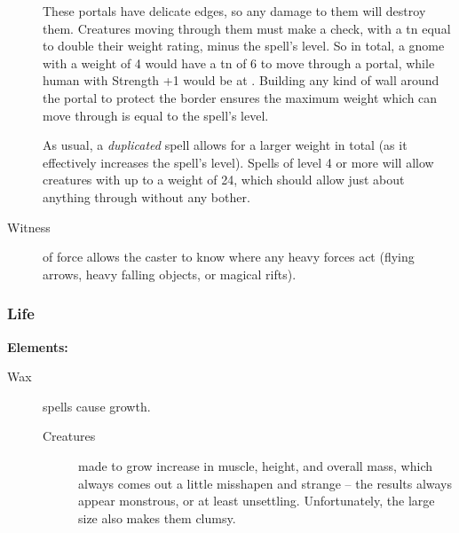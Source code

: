 \begin{multicols}{2}
\begin{description}
  These portals have delicate edges, so any damage to them will destroy them.
  Creatures moving through them must make a  check, with a \gls{tn} equal to double their \gls{weight} rating, minus the spell's level.
  So in total, a gnome with a \gls{weight} of 4 would have a \gls{tn} of 6 to move through a portal, while human with Strength +1 would be at \tn[12].
  Building any kind of wall around the portal to protect the border ensures the maximum \gls{weight} which can move through is equal to the spell's level.

  As usual, a \textit{duplicated} spell allows for a larger \gls{weight} in total (as it effectively increases the spell's level).
  Spells of level 4 or more will allow creatures with up to a \gls{weight} of 24, which should allow just about anything through without any bother.
  \item[Witness]
  of force allows the caster to know where any heavy forces act (flying arrows, heavy falling objects, or magical rifts).
\end{description}

\subsubsection{Life}

\textbf{Elements:}

\begin{description}
  \item[Wax]
  spells cause growth.
    \begin{description}
      \item[Creatures]
        made to grow increase in muscle, height, and overall mass, which always comes out a little misshapen and strange -- the results always appear monstrous, or at least unsettling.
        Unfortunately, the large size also makes them clumsy.


\end{description}
\end{description}
\end{multicols}

